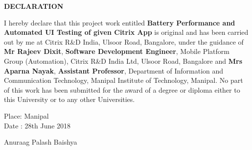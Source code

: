 \begin{center}
\large{\textbf{DECLARATION}}\\
\vspace{1cm}
\end{center}

\justify I hereby declare that this project work entitled \textbf{Battery Performance and Automated UI Testing of given Citrix App} is original and has been carried out by
me at Citrix R\&D India, Ulsoor Road, Bangalore, under the guidance of \textbf{Mr Rajeev Dixit}, \textbf{Software Development Engineer}, Mobile Platform Group (Automation), Citrix R\&D India Ltd, Ulsoor Road, Bangalore and \textbf{Mrs Aparna Nayak}, \textbf{Assistant Professor},  Department of Information and Communication Technology, Manipal Institute of Technology, Manipal. No part of this work has been submitted for the award of a degree or diploma either to this University or to any other Universities.



\vspace{2cm}

\begin{flushleft}
Place: Manipal\\
Date : 28th June 2018
\end{flushleft}


\begin{flushright}
Anuraag Palash Baishya\\
\end{flushright}